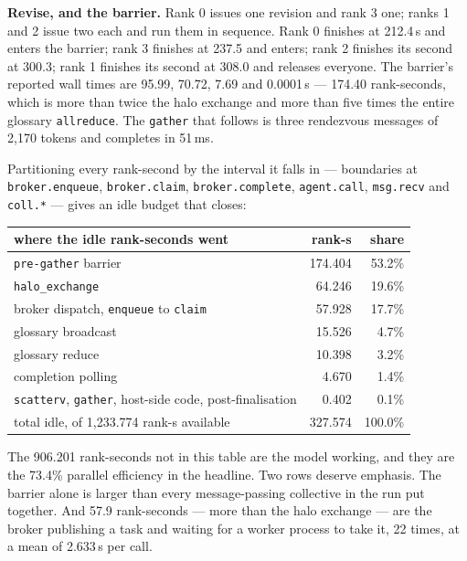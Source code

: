 \documentclass[11pt]{article}
\begin{document}
\textbf{Revise, and the barrier.} Rank 0 issues one revision and rank 3 one; ranks 1 and 2 issue
two each and run them in sequence. Rank 0 finishes at 212.4\,s and enters the barrier; rank 3
finishes at 237.5 and enters; rank 2 finishes its second at 300.3; rank 1 finishes its second at
308.0 and releases everyone. The barrier's reported wall times are 95.99, 70.72, 7.69 and
0.0001\,s --- 174.40 rank-seconds, which is more than twice the halo exchange and more than five
times the entire glossary \texttt{allreduce}. The \texttt{gather} that follows is three
rendezvous messages of 2{,}170 tokens and completes in 51\,ms.

Partitioning every rank-second by the interval it falls in --- boundaries at
\texttt{broker.enqueue}, \texttt{broker.claim}, \texttt{broker.complete}, \texttt{agent.call},
\texttt{msg.recv} and \texttt{coll.*} --- gives an idle budget that closes:

\begin{center}
\begin{tabular}{@{}lrr@{}}
\toprule
  where the idle rank-seconds went & rank-s & share \\
\midrule
  \texttt{pre-gather} barrier & 174.404 & 53.2\% \\
  \texttt{halo\_exchange} & 64.246 & 19.6\% \\
  broker dispatch, \texttt{enqueue} to \texttt{claim} & 57.928 & 17.7\% \\
  glossary broadcast & 15.526 & 4.7\% \\
  glossary reduce & 10.398 & 3.2\% \\
  completion polling & 4.670 & 1.4\% \\
  \texttt{scatterv}, \texttt{gather}, host-side code, post-finalisation & 0.402 & 0.1\% \\
\midrule
  total idle, of 1{,}233.774 rank-s available & 327.574 & 100.0\% \\
\bottomrule
\end{tabular}
\end{center}

The 906.201 rank-seconds not in this table are the model working, and they are the 73.4\% parallel
efficiency in the headline. Two rows deserve emphasis. The barrier alone is larger than every
message-passing collective in the run put together. And 57.9 rank-seconds --- more than the halo
exchange --- are the broker publishing a task and waiting for a worker process to take it,
22 times, at a mean of 2.633\,s per call.
\end{document}
